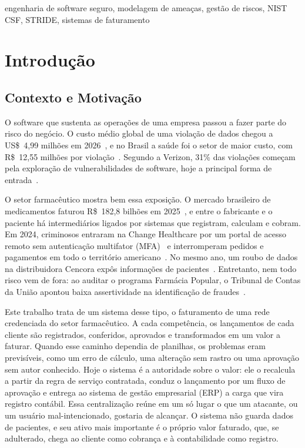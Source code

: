 \documentclass[conference]{IEEEtran}
\begin{document}
\begin{IEEEkeywords}
engenharia de software seguro, modelagem de ameaças, gestão de riscos, NIST CSF, STRIDE, sistemas de faturamento
\end{IEEEkeywords}

\section{Introdução}
\subsection{Contexto e Motivação}

O software que sustenta as operações de uma empresa passou a fazer parte do risco do negócio. O custo médio global de uma violação de dados chegou a US\$~4,99 milhões em 2026~\cite{ibm2026}, e no Brasil a saúde foi o setor de maior custo, com R\$~12,55 milhões por violação~\cite{lobo2026}. Segundo a Verizon, 31\% das violações começam pela exploração de vulnerabilidades de software, hoje a principal forma de entrada~\cite{verizon2026}.

O setor farmacêutico mostra bem essa exposição. O mercado brasileiro de medicamentos faturou R\$~182,8 bilhões em 2025~\cite{anvisa2026}, e entre o fabricante e o paciente há intermediários ligados por sistemas que registram, calculam e cobram. Em 2024, criminosos entraram na Change Healthcare por um portal de acesso remoto sem autenticação multifator (MFA)~\cite{witty2024} e interromperam pedidos e pagamentos em todo o território americano~\cite{murphy2024}. No mesmo ano, um roubo de dados na distribuidora Cencora expôs informações de pacientes~\cite{toulas2024}. Entretanto, nem todo risco vem de fora: ao auditar o programa Farmácia Popular, o Tribunal de Contas da União apontou baixa assertividade na identificação de fraudes~\cite{tcu2023}.

Este trabalho trata de um sistema desse tipo, o faturamento de uma rede credenciada do setor farmacêutico. A cada competência, os lançamentos de cada cliente são registrados, conferidos, aprovados e transformados em um valor a faturar. Quando esse caminho dependia de planilhas, os problemas eram previsíveis, como um erro de cálculo, uma alteração sem rastro ou uma aprovação sem autor conhecido. Hoje o sistema é a autoridade sobre o valor: ele o recalcula a partir da regra de serviço contratada, conduz o lançamento por um fluxo de aprovação e entrega ao sistema de gestão empresarial (ERP) a carga que vira registro contábil. Essa centralização reúne em um só lugar o que um atacante, ou um usuário mal-intencionado, gostaria de alcançar. O sistema não guarda dados de pacientes, e seu ativo mais importante é o próprio valor faturado, que, se adulterado, chega ao cliente como cobrança e à contabilidade como registro.
\end{document}
